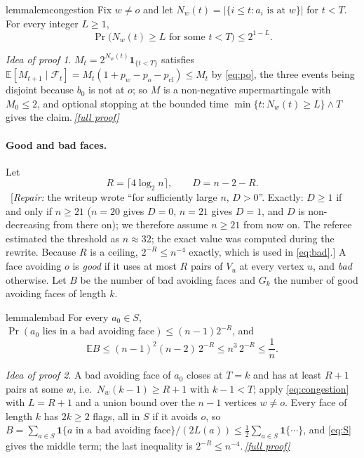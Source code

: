 \documentclass[11pt,a4paper]{article}
\theoremstyle{plain}
\theoremstyle{definition}
\theoremstyle{remark}
\newtheorem*{proofidea}{Idea of proof}
\newcommand{\fullproofref}[1]{\,\hyperref[#1]{\textit{[full proof]}}}
\newcommand{\E}{\mathbb E}
\newcommand{\cF}{\mathcal F}
\newcommand{\Ind}{\mathbf 1}
\newcommand{\repair}[1]{\ [\textit{Repair:} #1]}
\begin{document}
\begin{restatable}{lemma}{lemcongestion}\label{lem:congestion}
Fix $w\ne o$ and let $N_w(t)=|\{i\le t:a_i\text{ is at }w\}|$ for $t<T$. For every integer $L\ge1$,
\begin{equation}\label{eq:congestion}
\Pr\bigl(N_w(t)\ge L\text{ for some }t<T\bigr)\le2^{1-L}.
\end{equation}
\end{restatable}
\begin{proofidea}
$M_t=2^{N_w(t)}\Ind_{\{t<T\}}$ satisfies $\E[M_{t+1}\mid\cF_t]=M_t(1+p_w-p_o-p_{\mathrm{cl}})\le M_t$ by \eqref{eq:po}, the three events being disjoint because $b_0$ is not at $o$; so $M$ is a non-negative supermartingale with $M_0\le2$, and optional stopping at the bounded time $\min\{t:N_w(t)\ge L\}\wedge T$ gives the claim.\fullproofref{pf:congestion}
\end{proofidea}

\paragraph{Good and bad faces.} Let
\begin{equation}\label{eq:RD}
R=\lceil4\log_2n\rceil,\qquad D=n-2-R .
\end{equation}
\repair{the writeup wrote ``for sufficiently large $n$, $D>0$''. Exactly: $D\ge1$ if and only if $n\ge21$ ($n=20$ gives $D=0$, $n=21$ gives $D=1$, and $D$ is non-decreasing from there on); we therefore assume $n\ge21$ from now on. The referee estimated the threshold as $n\approx32$; the exact value was computed during the rewrite. Because $R$ is a ceiling, $2^{-R}\le n^{-4}$ exactly, which is used in \eqref{eq:bad}.}
A face avoiding $o$ is \emph{good} if it uses at most $R$ pairs of $V_u$ at every vertex $u$, and \emph{bad} otherwise. Let $B$ be the number of bad avoiding faces and $G_k$ the number of good avoiding faces of length $k$.

\begin{restatable}{lemma}{lembad}\label{lem:bad}
For every $a_0\in S$, $\Pr(a_0\text{ lies in a bad avoiding face})\le(n-1)2^{-R}$, and
\begin{equation}\label{eq:bad}
\E B\le(n-1)^2(n-2)\,2^{-R}\le n^3\,2^{-R}\le\frac1n .
\end{equation}
\end{restatable}
\begin{proofidea}
A bad avoiding face of $a_0$ closes at $T=k$ and has at least $R+1$ pairs at some $w$, i.e.\ $N_w(k-1)\ge R+1$ with $k-1<T$; apply \eqref{eq:congestion} with $L=R+1$ and a union bound over the $n-1$ vertices $w\ne o$. Every face of length $k$ has $2k\ge2$ flags, all in $S$ if it avoids $o$, so $B=\sum_{a\in S}\Ind\{a\text{ in a bad avoiding face}\}/(2L(a))\le\frac12\sum_{a\in S}\Ind\{\cdots\}$, and \eqref{eq:S} gives the middle term; the last inequality is $2^{-R}\le n^{-4}$.\fullproofref{pf:bad}
\end{proofidea}
\end{document}
